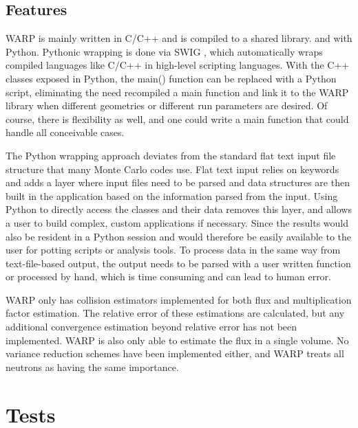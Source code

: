 \documentclass[preprint,12pt]{elsarticle}
\begin{document}
\subsection{Features}

WARP is mainly written in C/C++ and is compiled to a shared library.   and  with Python.  Pythonic wrapping is done via SWIG \cite{swig}, which automatically wraps compiled languages like C/C++ in high-level scripting languages.  With the C++ classes exposed in Python, the main() function can be replaced with a Python script, eliminating the need recompiled a main function and link it to the WARP library when different geometries or different run parameters are desired.  Of course, there is flexibility as well, and one could write a main function that could handle all conceivable cases. 

The Python wrapping approach deviates from the standard flat text input file structure that many Monte Carlo codes use.  Flat text input relies on keywords and adds a layer where input files need to be parsed and data structures are then built in the application based on the information parsed from the input.  Using Python to directly access the classes and their data removes this layer, and allows a user to build complex, custom applications if necessary.  Since the results would also be resident in a Python session and would therefore be easily available to the user for potting scripts or analysis tools.  To process data in the same way from text-file-based output, the output needs to be parsed with a user written function or processed by hand, which is time consuming and can lead to human error.

WARP only has collision estimators implemented for both flux and multiplication factor estimation.  The relative error of these estimations are calculated, but any additional convergence estimation beyond relative error has not been implemented.  WARP is also only able to estimate the flux in a single volume.  No variance reduction schemes have been implemented either, and WARP treats all neutrons as having the same importance.

\section{Tests}
\label{sec:tests}
\end{document}
